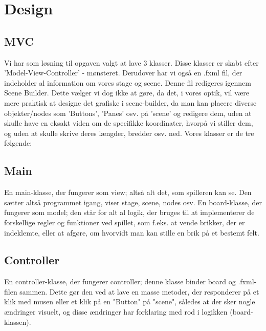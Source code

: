 \section{Design}
\subsection{MVC}\label{MVC}
Vi har som løsning til opgaven valgt at lave 3 klasser. Disse klasser er skabt efter 'Model-View-Controller' - mønsteret. Derudover har vi også en .fxml fil, der indeholder al information om vores stage og scene. Denne fil redigeres igennem Scene Builder. Dette vælger vi dog ikke at gøre, da det, i vores optik, vil være mere praktisk at designe det grafiske i scene-builder, da man kan placere diverse objekter/nodes som 'Buttons', 'Panes' osv. på 'scene' og redigere dem, uden at skulle have en eksakt viden om de specifikke koordinater, hvorpå vi stiller dem, og uden at skulle skrive deres længder, bredder osv. ned. Vores klasser er de tre følgende:
\subsection{Main}
En main-klasse, der fungerer som view; altså alt det, som spilleren kan se. Den sætter altså programmet igang, viser stage, scene, nodes osv. En board-klasse, der fungerer som model; den står for alt al logik, der bruges til at implementerer de forskellige regler og funktioner ved spillet, som f.eks. at vende brikker, der er indeklemte, eller at afgøre, om hvorvidt man kan stille en brik på et bestemt felt. 
\subsection{Controller}
En controller-klasse, der fungerer controller; denne klasse binder board og .fxml-filen sammen. Dette gør den ved at lave en masse metoder, der responderer på et klik med musen eller et klik på en "Button" på "scene", således at der sker nogle ændringer visuelt, og disse ændringer har forklaring med rod i logikken (board-klassen).
